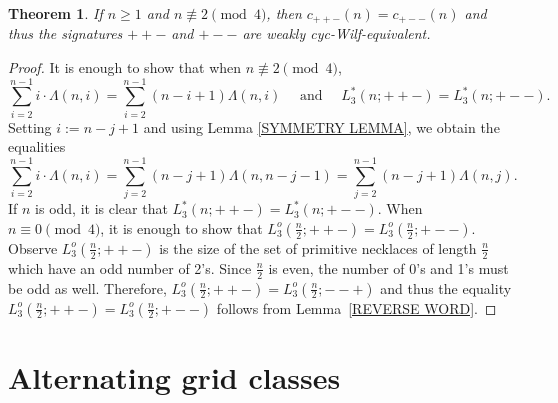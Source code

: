 \documentclass[12pt]{article}
\newcommand{\todo}[1]{\vspace{2 mm}\par\noindent
   \marginpar[\flushright\textsc{ToDo}]{\textsc{ToDo}}\framebox{\begin{minipage}[c]{\textwidth}
   \tt #1 \end{minipage}}\vspace{2 mm}\par}
\theoremstyle{plain}
\newtheorem{theorem}{Theorem}
\theoremstyle{definition}
\begin{document}
\begin{theorem}
If $n\geq 1$ and $n\not\equiv 2 \!\pmod 4$, then $c_{++-}(n) = c_{+--}(n)$ and thus the signatures $++-$ and $+--$ are weakly cyc-Wilf-equivalent.
\end{theorem}

\begin{proof}
It is enough to show that when $n\not\equiv 2 \!\pmod 4$, $$\sum_{i=2}^{n-1}i\cdot\Lambda(n,i) = \sum_{i=2}^{n-1}(n-i+1)\Lambda(n,i) \quad \text{ and } \quad L^*_3(n;++-) = L^*_3(n;+--).$$
Setting $i:=n-j+1$ and using Lemma \ref{SYMMETRY LEMMA}, we obtain the equalities $$\sum_{i=2}^{n-1}i\cdot \Lambda(n,i) = \sum_{j=2}^{n-1}(n-j+1)\Lambda(n,n-j-1) = \sum_{j=2}^{n-1}(n-j+1)\Lambda(n,j).$$
If $n$ is odd, it is clear that $L^*_3(n;++-) = L^*_3(n;+--)$. When $n\equiv 0 \!\pmod 4$, it is enough to show that $L^o_3(\frac{n}{2}; ++-) = L^o_3(\frac{n}{2}; +--).$ Observe $L^o_3(\frac{n}{2}; ++-)$ is the size of the set of primitive necklaces of length $\frac{n}{2}$ which have an odd number of 2's. Since $\frac{n}{2}$ is even,  the number of 0's and 1's must be odd as well. Therefore, $L^o_3(\frac{n}{2}; ++-) = L^o_3(\frac{n}{2}; --+)$  and thus the equality $L^o_3(\frac{n}{2}; ++-) = L^o_3(\frac{n}{2}; +--)$ follows from Lemma~\ref{REVERSE WORD}.
\end{proof}


%

\section{Alternating grid classes}\label{SECTION ALTERNATING}
\end{document}
